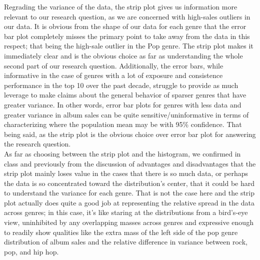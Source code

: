 Regrading the variance of the data, the strip plot gives us information more relevant to our research question, as we are concerned with high-sales outliers in our data. It is obvious from the shape of our data for each genre that the error bar plot completely misses the primary point to take away from the data in this respect; that being the high-sale outlier in the Pop genre. The strip plot makes it immediately clear and is the obvious choice as far as understanding the whole second part of our research question. Additionally, the error bars, while informative in the case of genres with a lot of exposure and consistence performance in the top 10 over the past decade, struggle to provide as much leverage to make claims about the general behavior of sparser genres that have greater variance. In other words, error bar plots for genres with less data and greater variance in album sales can be quite sensitive/uninformative in terms of characterizing where the population mean may be with 95\% confidence. That being said, as the strip plot is the obvious choice over error bar plot for answering the research question. \\

As far as choosing between the strip plot and the histogram, we confirmed in class and previously from the discussion of advantages and disadvantages that the strip plot mainly loses value in the cases that there is so much data, or perhaps the data is so concentrated toward the distribution's center, that it could be hard to understand the variance for each genre. That is not the case here and the strip plot actually does quite a good job at representing the relative spread in the data across genres; in this case, it's like staring at the distributions from a bird's-eye view, uninhibited by any overlapping masses across genres and expressive enough to readily show qualities like the extra mass of the left side of the pop genre distribution of album sales and the relative difference in variance between rock, pop, and hip hop.
\newpage